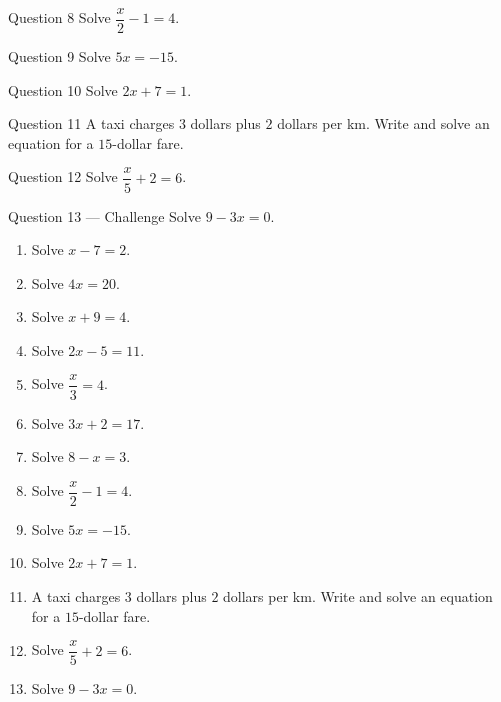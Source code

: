 \documentclass[11pt]{article}
\begin{document}
\begin{qbox}{Question 8}
Solve $\dfrac{x}{2}-1=4$.\workspace{2.0cm}
\end{qbox}

\begin{qbox}{Question 9}
Solve $5x=-15$.\workspace{1.8cm}
\end{qbox}

\begin{qbox}{Question 10}
Solve $2x+7=1$.\workspace{2.0cm}
\end{qbox}

\begin{qbox}{Question 11}
A taxi charges $3$ dollars plus $2$ dollars per km. Write and solve an equation for a $15$-dollar fare.\workspace{2.6cm}
\end{qbox}

\begin{qbox}{Question 12}
Solve $\dfrac{x}{5}+2=6$.\workspace{2.0cm}
\end{qbox}

\begin{qbox}{Question 13 --- Challenge}
Solve $9-3x=0$.\workspace{2.0cm}
\end{qbox}

\clearpage
{}

\begin{recapbox}
\begin{multicols}{2}
\small
\begin{enumerate}[leftmargin=*,itemsep=3pt]
  \item Solve $x-7=2$.
  \item Solve $4x=20$.
  \item Solve $x+9=4$.
  \item Solve $2x-5=11$.
  \item Solve $\dfrac{x}{3}=4$.
  \item Solve $3x+2=17$.
  \item Solve $8-x=3$.
  \item Solve $\dfrac{x}{2}-1=4$.
  \item Solve $5x=-15$.
  \item Solve $2x+7=1$.
  \item A taxi charges $3$ dollars plus $2$ dollars per km. Write and solve an equation for a $15$-dollar fare.
  \item Solve $\dfrac{x}{5}+2=6$.
  \item Solve $9-3x=0$.
\end{enumerate}
\end{multicols}
\end{recapbox}
\end{document}

